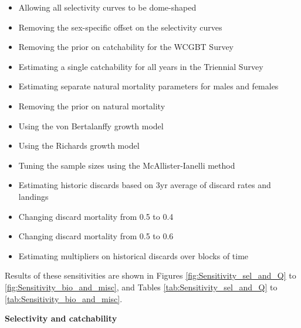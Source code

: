 \documentclass[12pt,]{article}
\begin{document}
\begin{itemize}

  \item Allowing all selectivity curves to be dome-shaped

  \item Removing the sex-specific offset on the selectivity curves
  
  \item Removing the prior on catchability for the WCGBT Survey
  
  \item Estimating a single catchability for all years in the Triennial Survey
  
  \item Estimating separate natural mortality parameters for males and females
  
  \item Removing the prior on natural mortality
  
  \item Using the von Bertalanffy growth model

  \item Using the Richards growth model

  \item Tuning the sample sizes using the McAllister-Ianelli method
  
  \item Estimating historic discards based on 3yr average of discard rates and landings
  
  \item Changing discard mortality from 0.5 to 0.4
  
  \item Changing discard mortality from 0.5 to 0.6

  \item Estimating multipliers on historical discards over blocks of time
  
\end{itemize}

Results of these sensitivities are shown in Figures
\ref{fig:Sensitivity_sel_and_Q} to \ref{fig:Sensitivity_bio_and_misc},
and Tables \ref{tab:Sensitivity_sel_and_Q} to
\ref{tab:Sensitivity_bio_and_misc}.

\textbf{Selectivity and catchability}
\end{document}
